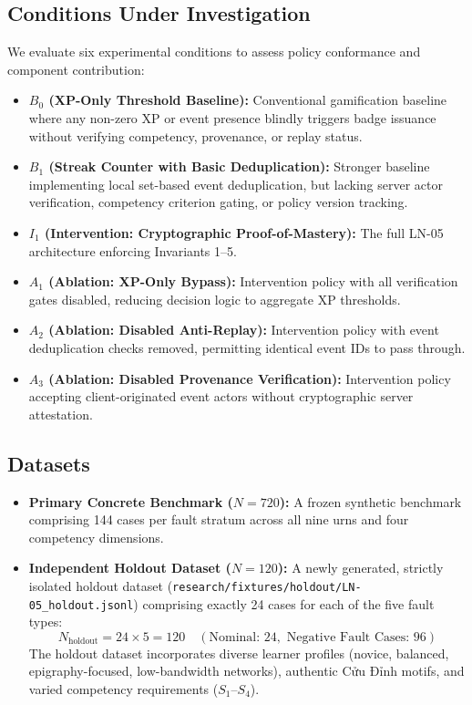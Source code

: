 \documentclass[11pt,a4paper]{article}
\begin{document}
\subsection{Conditions Under Investigation}
We evaluate six experimental conditions to assess policy conformance and component contribution:
\begin{itemize}[leftmargin=*]
    \item \textbf{$B_0$ (XP-Only Threshold Baseline):} Conventional gamification baseline where any non-zero XP or event presence blindly triggers badge issuance without verifying competency, provenance, or replay status.
    \item \textbf{$B_1$ (Streak Counter with Basic Deduplication):} Stronger baseline implementing local set-based event deduplication, but lacking server actor verification, competency criterion gating, or policy version tracking.
    \item \textbf{$I_1$ (Intervention: Cryptographic Proof-of-Mastery):} The full LN-05 architecture enforcing Invariants 1--5.
    \item \textbf{$A_1$ (Ablation: XP-Only Bypass):} Intervention policy with all verification gates disabled, reducing decision logic to aggregate XP thresholds.
    \item \textbf{$A_2$ (Ablation: Disabled Anti-Replay):} Intervention policy with event deduplication checks removed, permitting identical event IDs to pass through.
    \item \textbf{$A_3$ (Ablation: Disabled Provenance Verification):} Intervention policy accepting client-originated event actors without cryptographic server attestation.
\end{itemize}

\subsection{Datasets}
\begin{itemize}[leftmargin=*]
    \item \textbf{Primary Concrete Benchmark ($N = 720$):} A frozen synthetic benchmark comprising 144 cases per fault stratum across all nine urns and four competency dimensions.
    \item \textbf{Independent Holdout Dataset ($N = 120$):} A newly generated, strictly isolated holdout dataset (\texttt{research/fixtures/holdout/LN-05\_holdout.jsonl}) comprising exactly 24 cases for each of the five fault types:
    \begin{equation}
    N_{\text{holdout}} = 24 \times 5 = 120 \quad (\text{Nominal: } 24, \text{ Negative Fault Cases: } 96)
    \end{equation}
    The holdout dataset incorporates diverse learner profiles (novice, balanced, epigraphy-focused, low-bandwidth networks), authentic Cửu Đỉnh motifs, and varied competency requirements ($S_1$--$S_4$).
\end{itemize}
\end{document}
